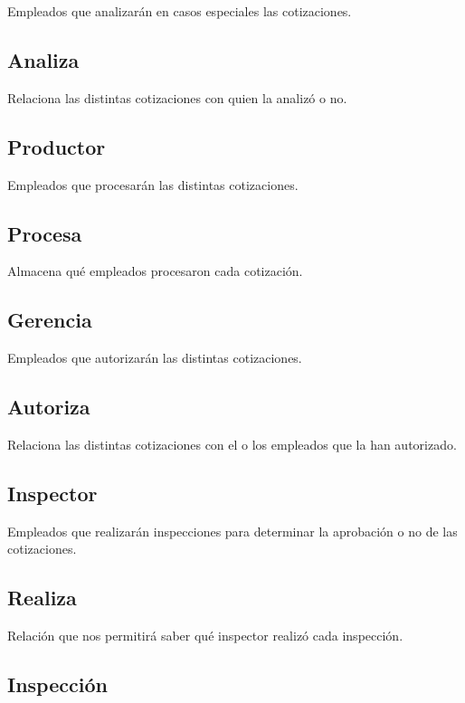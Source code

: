 \documentclass[a4paper,11pt]{article}
\begin{document}
Empleados que analizarán en casos especiales las cotizaciones.

\subsection{Analiza}

Relaciona las distintas cotizaciones con quien la analizó o no.

\subsection{Productor}

Empleados que procesarán las distintas cotizaciones.

\subsection{Procesa}

Almacena qué empleados procesaron cada cotización.

\subsection{Gerencia}

Empleados que autorizarán las distintas cotizaciones.

\subsection{Autoriza}

Relaciona las distintas cotizaciones con el o los empleados que la han autorizado.

\subsection{Inspector}

Empleados que realizarán inspecciones para determinar 
la aprobación o no de las cotizaciones.

\subsection{Realiza}

Relación que nos permitirá saber qué inspector realizó cada inspección.

\subsection{Inspección}
\end{document}
